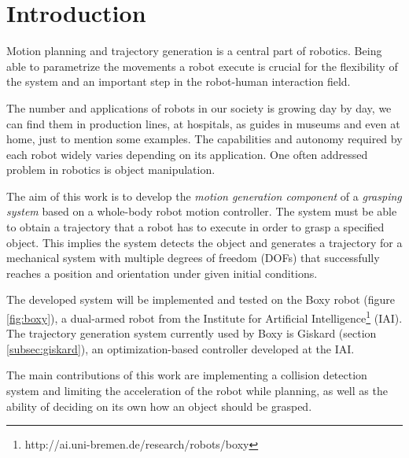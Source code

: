

\chapter{\textbf{Introduction}}

Motion planning and trajectory generation is a central part of robotics. Being able to parametrize the movements a robot execute is crucial for the flexibility of the system and an important step in the robot-human interaction field.

The number and applications of robots in our society is growing day by day, we can find them in production lines, at hospitals, as guides in museums and even at home, just to mention some examples. The capabilities and autonomy required by each robot widely varies depending on its application. One often addressed problem in robotics is object manipulation.

The aim of this work is to develop the \textit{motion generation component} of a \textit{grasping system} based on a whole-body robot motion controller. The system must be able to obtain a trajectory that a robot has to execute in order to grasp a specified object. This implies the system detects the object and generates a trajectory for a mechanical system with multiple degrees of freedom (DOFs) that successfully reaches a position and orientation under given initial conditions.

The developed system will be implemented and tested on the Boxy robot (figure \ref{fig:boxy}), a dual-armed robot from the Institute for Artificial Intelligence\footnote{http://ai.uni-bremen.de/research/robots/boxy} (IAI). The trajectory generation system currently used by Boxy is Giskard (section \ref{subsec:giskard}), an optimization-based controller developed at the IAI. 

The main contributions of this work are implementing a collision detection system and limiting the acceleration of the robot while planning, as well as the ability of deciding on its own how an object should be grasped.

